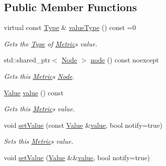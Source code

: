 \subsection*{Public Member Functions}
\begin{DoxyCompactItemize}
\item 
virtual const \hyperlink{classdg_1_1deepcore_1_1_type}{Type} \& \hyperlink{classdg_1_1deepcore_1_1_metric_a5f9522838757d77a38aad6acdb35852f}{value\+Type} () const =0
\begin{DoxyCompactList}\small\item\em Gets the \hyperlink{classdg_1_1deepcore_1_1_type}{Type} of \hyperlink{classdg_1_1deepcore_1_1_metric}{Metric}\textquotesingle{}s value. \end{DoxyCompactList}\item 
std\+::shared\+\_\+ptr$<$ \hyperlink{classdg_1_1deepcore_1_1_node}{Node} $>$ \hyperlink{classdg_1_1deepcore_1_1_metric_ae5f748b7a393cc48b31ef95423dda28a}{node} () const noexcept
\begin{DoxyCompactList}\small\item\em Gets this \hyperlink{classdg_1_1deepcore_1_1_metric}{Metric}\textquotesingle{}s \hyperlink{classdg_1_1deepcore_1_1_node}{Node}. \end{DoxyCompactList}\item 
\hyperlink{classdg_1_1deepcore_1_1_value}{Value} \hyperlink{classdg_1_1deepcore_1_1_metric_a65106535395d90b5d0e2f6759579a009}{value} () const 
\begin{DoxyCompactList}\small\item\em Gets this \hyperlink{classdg_1_1deepcore_1_1_metric}{Metric}\textquotesingle{}s value. \end{DoxyCompactList}\item 
void \hyperlink{classdg_1_1deepcore_1_1_metric_a951f45d7e2f0d17bb939ed5efc852548}{set\+Value} (const \hyperlink{classdg_1_1deepcore_1_1_value}{Value} \&\hyperlink{classdg_1_1deepcore_1_1_metric_a65106535395d90b5d0e2f6759579a009}{value}, bool notify=true)
\begin{DoxyCompactList}\small\item\em Sets this \hyperlink{classdg_1_1deepcore_1_1_metric}{Metric}\textquotesingle{}s value. \end{DoxyCompactList}\item 
void \hyperlink{classdg_1_1deepcore_1_1_metric_a76ae6e3cfe3fce8ba216fcd6d3328dfd}{set\+Value} (\hyperlink{classdg_1_1deepcore_1_1_value}{Value} \&\&\hyperlink{classdg_1_1deepcore_1_1_metric_a65106535395d90b5d0e2f6759579a009}{value}, bool notify=true)

\end{DoxyCompactItemize}
